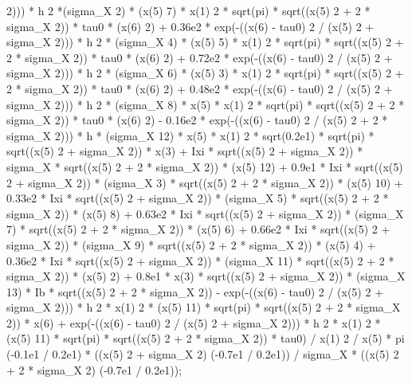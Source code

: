 \begin{maplegroup}
 2))) * h  2 *(sigma\_X  2) * (x(5)  7) * x(1)  2 * sqrt(pi) * sqrt((x(5)  2 + 2 * sigma\_X  2)) * tau0 * (x(6)  2) + 0.36e2 * exp(-((x(6) - tau0)  2 / (x(5)  2 + sigma\_X  2))) * h  2 * (sigma\_X  4) * (x(5)  5) * x(1)  2 * sqrt(pi) * sqrt((x(5)  2 + 2 * sigma\_X  2)) * tau0 * (x(6)  2) + 0.72e2 * exp(-((x(6) - tau0)  2 / (x(5)  2 + sigma\_X  2))) * h  2 * (sigma\_X  6) * (x(5)  3) * x(1)  2 * sqrt(pi) * sqrt((x(5)  2 + 2 * sigma\_X  2)) * tau0 * (x(6)  2) + 0.48e2 * exp(-((x(6) - tau0)  2 / (x(5) 2 + sigma\_X  2))) * h  2 * (sigma\_X  8) * x(5) * x(1)  2 * sqrt(pi) * sqrt((x(5)  2 + 2 * sigma\_X  2)) * tau0 * (x(6)  2) - 0.16e2 * exp(-((x(6) - tau0)  2 / (x(5)  2 + 2 * sigma\_X  2))) * h * (sigma\_X  12) * x(5) * x(1)  2 * sqrt(0.2e1) * sqrt(pi) * sqrt((x(5)  2 + sigma\_X  2)) * x(3) + Ixi * sqrt((x(5)  2 + sigma\_X  2)) * sigma\_X * sqrt((x(5)  2 + 2 * sigma\_X  2)) * (x(5)  12) + 0.9e1 * Ixi * sqrt((x(5)  2 + sigma\_X  2)) * (sigma\_X  3) * sqrt((x(5)  2 + 2 * sigma\_X  2)) * (x(5)  10) + 0.33e2 * Ixi * sqrt((x(5)  2 + sigma\_X  2)) * (sigma\_X  5) * sqrt((x(5)  2 + 2 * sigma\_X  2)) * (x(5)  8) + 0.63e2 * Ixi * sqrt((x(5)  2 + sigma\_X  2)) * (sigma\_X  7) * sqrt((x(5)  2 + 2 * sigma\_X  2)) * (x(5)  6) + 0.66e2 * Ixi * sqrt((x(5)  2 + sigma\_X  2)) * (sigma\_X  9) * sqrt((x(5)  2 + 2 * sigma\_X  2)) * (x(5)  4) + 0.36e2 * Ixi * sqrt((x(5)  2 + sigma\_X  2)) * (sigma\_X  11) * sqrt((x(5)  2 + 2 * sigma\_X  2)) * (x(5)  2) + 0.8e1 * x(3) * sqrt((x(5)  2 + sigma\_X  2)) * (sigma\_X  13) * Ib * sqrt((x(5)  2 + 2 * sigma\_X  2)) - exp(-((x(6) - tau0)  2 / (x(5)  2 + sigma\_X  2))) * h  2 * x(1)  2 * (x(5)  11) * sqrt(pi) * sqrt((x(5)  2 + 2 * sigma\_X  2)) * x(6) + exp(-((x(6) - tau0)  2 / (x(5)  2 + sigma\_X  2))) * h 2 * x(1)  2 * (x(5)  11) * sqrt(pi) * sqrt((x(5)  2 + 2 * sigma\_X  2)) * tau0) / x(1)  2 / x(5) * pi  (-0.1e1 / 0.2e1) * ((x(5)  2 + sigma\_X  2)  (-0.7e1 / 0.2e1)) / sigma\_X * ((x(5)  2 + 2 * sigma\_X  2)  (-0.7e1 / 0.2e1));

\end{maplegroup}

